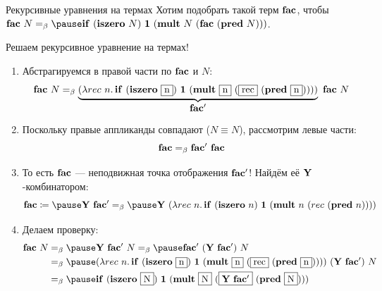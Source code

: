     \begin{frame}{Рекурсивные уравнения на термах}
        Хотим подобрать такой терм $\mathbf{fac}$, чтобы $\term{fac} \ap N \eqbeta \pause \term{if} \ap (\term{iszero} \ap N) \ap \term{1} \ap (\term{mult} \ap N \ap (\term{fac} \ap (\term{pred} \ap N)))$.

        \pause
        \vspace{0.5em}
        Решаем рекурсивное уравнение на термах!
        \begin{enumerate}
            \item \pause Абстрагируемся в правой части по $\mathbf{fac}$ и $N$:
            \[
                \term{fac} \ap N
                \eqbeta
                \underbrace{(\lambda rec \ap n \ldotp \term{if} \ap (\term{iszero} \ap \framebox{n}) \ap \term{1} \ap (\term{mult} \ap \framebox{n} \ap (\framebox{rec} \ap (\term{pred} \ap \framebox{n}))))}_{\textstyle \term{fac'}}
                \ap \term{fac} \ap N
            \]
            \item \pause Поскольку правые аппликанды совпадают ($N \equiv N$), рассмотрим левые части:
            \[
                \mathbf{fac} =_{\beta} \mathbf{fac'} ~ \mathbf{fac}
            \]
            \item \pause То есть $\mathbf{fac}$ --- неподвижная точка отображения $\mathbf{fac'}$!  Найдём её $\mathbf{Y}$-комбинатором:
            \[
                \term{fac}
                \termdef \pause
                \comb{Y} \ap \term{fac'}
                \eqt_{\beta} \pause
                \comb{Y} \ap (\lambda rec \ap n \ldotp \term{if} \ap (\term{iszero} \ap n) \ap \term{1} \ap (\term{mult} \ap n \ap (rec \ap (\term{pred} \ap n))))
            \]
            \vspace{-1em}
            \item \pause Делаем проверку:
            \begin{align*}
                \term{fac} \ap N
                &\eqbeta \pause
                \comb{Y} \ap \term{fac'} \ap N
                \eqbeta \pause
                \term{fac'} \ap (\comb{Y} \ap \term{fac'}) \ap N
                \\&\eqbeta \pause
                (\lambda rec \ap n \ldotp \term{if} \ap (\term{iszero} \ap \framebox{n}) \ap \term{1} \ap (\term{mult} \ap \framebox{n} \ap (\framebox{rec} \ap (\term{pred} \ap \framebox{n})))) \ap (\comb{Y} \ap \term{fac'}) \ap N
                \\&\eqbeta \pause
                \term{if} \ap (\term{iszero} \ap \framebox{N}) \ap \term{1} \ap (\term{mult} \ap \framebox{N} \ap (\framebox{$\comb{Y} \ap \term{fac'}$} \ap (\term{pred} \ap \framebox{N})))
            \end{align*}
        \end{enumerate}
    \end{frame}

